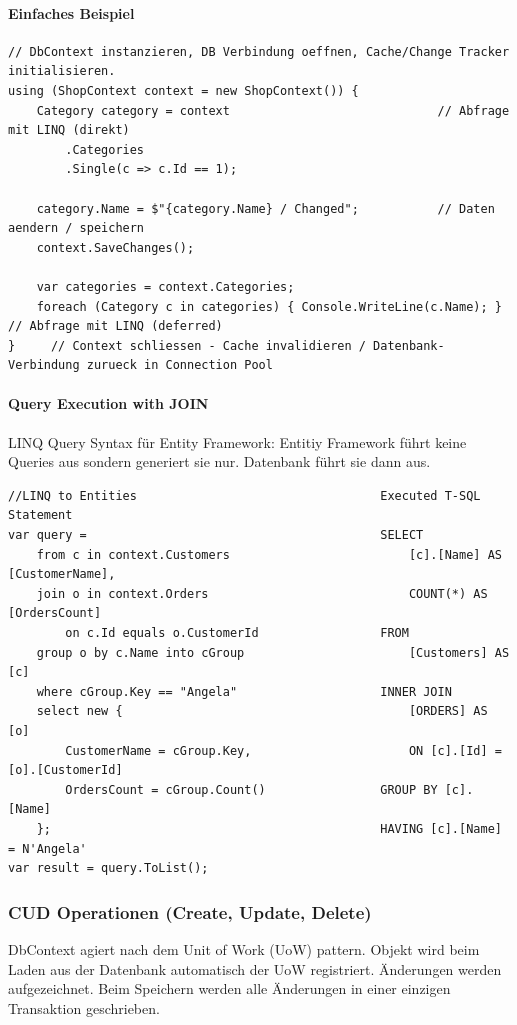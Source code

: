 \documentclass[
a4paper,
oneside,
10pt,
fleqn,
headsepline,
toc=listofnumbered, 
bibliography=totocnumbered]{scrartcl}
\begin{document}
\paragraph{Einfaches Beispiel}
\begin{lstlisting} 
// DbContext instanzieren, DB Verbindung oeffnen, Cache/Change Tracker initialisieren.
using (ShopContext context = new ShopContext()) {          
    Category category = context                             // Abfrage mit LINQ (direkt)
        .Categories
        .Single(c => c.Id == 1);
        
    category.Name = $"{category.Name} / Changed";           // Daten aendern / speichern 
    context.SaveChanges();
    
    var categories = context.Categories;
    foreach (Category c in categories) { Console.WriteLine(c.Name); }       // Abfrage mit LINQ (deferred)
}     // Context schliessen - Cache invalidieren / Datenbank-Verbindung zurueck in Connection Pool
\end{lstlisting}

\paragraph{Query Execution with JOIN}
LINQ Query Syntax für Entity Framework:
Entitiy Framework führt keine Queries aus sondern generiert sie nur. Datenbank führt sie dann aus.
\begin{lstlisting}
//LINQ to Entities                                  Executed T-SQL Statement
var query =                                         SELECT
    from c in context.Customers                         [c].[Name] AS [CustomerName],
    join o in context.Orders                            COUNT(*) AS [OrdersCount]
        on c.Id equals o.CustomerId                 FROM
    group o by c.Name into cGroup                       [Customers] AS [c]
    where cGroup.Key == "Angela"                    INNER JOIN
    select new {                                        [ORDERS] AS [o]
        CustomerName = cGroup.Key,                      ON [c].[Id] = [o].[CustomerId]
        OrdersCount = cGroup.Count()                GROUP BY [c].[Name]
    };                                              HAVING [c].[Name] = N'Angela'
var result = query.ToList();
\end{lstlisting}

\subsubsection{CUD Operationen (Create, Update, Delete)}
DbContext agiert nach dem Unit of Work (UoW) pattern. Objekt wird beim Laden aus der Datenbank automatisch der UoW registriert. Änderungen werden aufgezeichnet. Beim Speichern werden alle Änderungen in einer einzigen Transaktion geschrieben.
\end{document}
